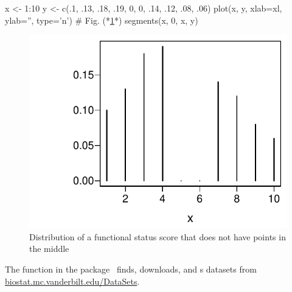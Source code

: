 \begin{Schunk}
\begin{Sinput}
x <- 1:10
y <- c(.1, .13, .18, .19, 0, 0, .14, .12, .08, .06)
plot(x, y, xlab=xl, ylab='', type='n')   # Fig. (*\ref{fig:descript-ordb}*)
segments(x, 0, x, y)
\end{Sinput}
\begin{figure}[htbp]

\centerline{\includegraphics[width=\maxwidth]{descript-ordb-1} }

\caption[Ordinal variable with strange distribution]{Distribution of a functional status score that does not have points in the middle}\label{fig:descript-ordb}
\end{figure}
\end{Schunk}
The  function in the  package~\cite{Hmisc}
finds, downloads, and s datasets from
\href{http://biostat.mc.vanderbilt.edu/wiki/Main/DataSets}{biostat.mc.vanderbilt.edu/DataSets}.
